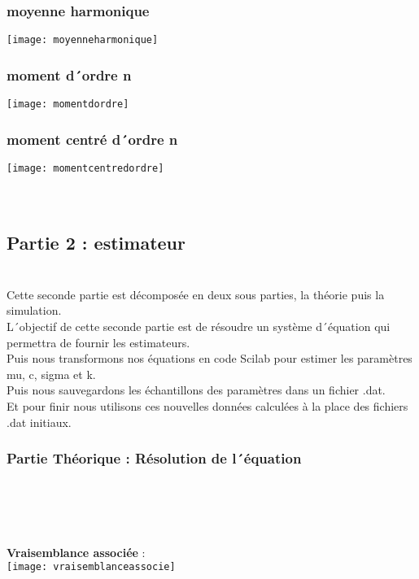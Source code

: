 \documentclass[a4paper,12pt,reqno]{article}
\newcommand{\newparagraphe}[1]{\paragraph{#1}\mbox{}\\}
\begin{document}
\subsubsection{moyenne harmonique}
\texttt{[image: moyenneharmonique]}\\

\subsubsection{moment d\'\ ordre n}
\texttt{[image: momentdordre]}\\

\subsubsection{moment centr\'e d\'\ ordre n}
\texttt{[image: momentcentredordre]}\\

\newparagraphe{}
\pagebreak

\subsection{Partie 2 : estimateur }
\newparagraphe{}

Cette seconde partie est d\'ecompos\'ee en deux sous parties, la th\'eorie puis la simulation.\\
L\'\ objectif de cette seconde partie est de r\'esoudre un syst\`{e}me d\'\ \'equation qui permettra de fournir les estimateurs.\\
Puis nous transformons nos \'equations en code Scilab pour estimer les param\`{e}tres mu, c, sigma et k.\\
Puis nous sauvegardons les \'echantillons des param\`{e}tres dans un fichier .dat.\\
Et pour finir nous utilisons ces nouvelles donn\'ees calcul\'ees \`{a} la place des fichiers .dat initiaux.\\

\subsubsection{Partie Th\'eorique : R\'esolution de l\'\ \'equation }\\
\\
\\
\\
\textbf{ Vraisemblance associ\'ee} :\\
\texttt{[image: vraisemblanceassocie]}\\\\
\end{document}
